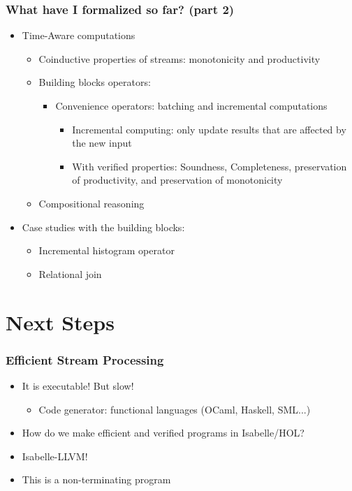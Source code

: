 \documentclass[aspectratio=169,10pt]{beamer}
\begin{document}
\begin{frame}[fragile]
  \frametitle{What have I formalized so far?  (part 2)}
  \begin{itemize}
    \item Time-Aware computations
          \begin{itemize}
            \item Coinductive properties of streams: monotonicity and productivity
            \item Building blocks operators:
                  \begin{itemize}
                    \item Convenience operators: batching and incremental computations
                          \begin{itemize}
                            \item Incremental computing: only update results that are affected by the new input
                            \item With verified properties: Soundness, Completeness, preservation of productivity, and preservation of monotonicity
                          \end{itemize}
                  \end{itemize}
            \item Compositional reasoning
          \end{itemize}
    \item Case studies with the building blocks:
          \begin{itemize}
            \item Incremental histogram operator
            \item Relational join
          \end{itemize}
  \end{itemize}
\end{frame}

\section{Next Steps}

\begin{frame}[fragile]
  \frametitle{Efficient Stream Processing}
  \begin{itemize}
    \item It is executable! But slow!
          \begin{itemize}
            \item Code generator: functional languages (OCaml, Haskell, SML...)
          \end{itemize}
    \pause
    \item How do we make efficient and verified programs in Isabelle/HOL?
          \pause
          \item Isabelle-LLVM!
    \item This is a non-terminating program
    \end{itemize}
\end{frame}
\end{document}
